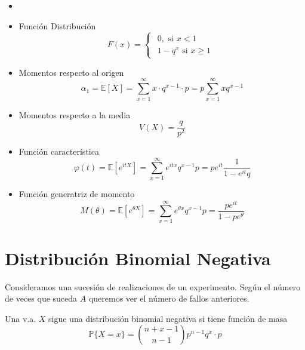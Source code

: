 \begin{prop}
  \begin{itemize}
    \item []
    \item Función Distribución
      \[ 
        F(x)  =
        \begin{cases}
          \begin{aligned}
            0, \text{ si } x < 1 \\
            1 - q^{x} \text{ si } x \geq 1
          \end{aligned}
        \end{cases}
      \] 
    \item Momentos respecto al origen
      \[ 
        \alpha_{1} = \mathbb{E} [ X ] = \sum_{x = 1}^{\infty} x \cdot q^{x -1} \cdot p = p \sum_{x = 1}^{\infty} x q^{x -1} 
      \] 
    \item Momentos respecto a la media
      \[ 
        V(X) = \frac{q}{p^{2}} 
      \] 
    \item Función característica
      \[ 
        \varphi(t) = \mathbb{E} [ e^{i t X} ] = \sum_{x = 1}^{\infty} e^{itx} q^{x-1} p = p e^{it} \frac{1}{1 - e^{it} q}
      \] 
    \item Función generatriz de momento
      \[ 
        M(\theta) = \mathbb{E} [ e^{\theta X} ] = \sum_{x = 1}^{\infty} e^{\theta x} q^{x - 1} p = \frac{p e^{it}}{1 - p e^{\theta}}
      \] 
  \end{itemize}
\end{prop}

\section{Distribución Binomial Negativa}

Consideramos una sucesión de realizaciones de un experimento. Según el número de veces que suceda $A$ queremos ver el número de fallos anteriores.

\begin{defn}
  Una v.a. $X$ sigue una distribución binomial negativa si tiene función de masa
  \[ 
    \mathbb{P} \{ X = x \} = \binom{n + x - 1}{n - 1} p ^{n - 1} q ^{x} \cdot p 
  \] 
\end{defn}

